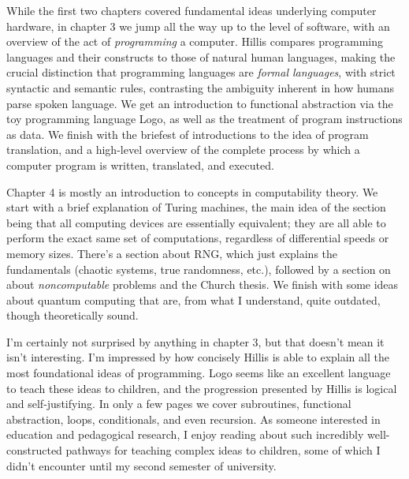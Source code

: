 \documentclass[12pt]{article}
\begin{document}

\pagestyle{fancy}
\fancyhead{} %


While the first two chapters covered fundamental ideas underlying computer
hardware, in chapter 3 we jump all the way up to the level of software, with an
overview of the act of \textit{programming} a computer. Hillis compares
programming languages and their constructs to those of natural human languages,
making the crucial distinction that programming languages are \textit{formal
languages}, with strict syntactic and semantic rules, contrasting the ambiguity
inherent in how humans parse spoken language. We get an introduction to
functional abstraction via the toy programming language Logo, as well as the
treatment of program instructions as data. We finish with the briefest of
introductions to the idea of program translation, and a high-level overview of
the complete process by which a computer program is written, translated, and
executed.

Chapter 4 is mostly an introduction to concepts in computability theory. We
start with a brief explanation of Turing machines, the main idea of the section
being that all computing devices are essentially equivalent; they are all able
to perform the exact same set of computations, regardless of differential
speeds or memory sizes. There's a section about RNG, which just explains the
fundamentals (chaotic systems, true randomness, etc.), followed by a section on
about \textit{noncomputable} problems and the Church thesis. We finish with
some ideas about quantum computing that are, from what I understand, quite
outdated, though theoretically sound.

\vspace{1em}

I'm certainly not surprised by anything in chapter 3, but that doesn't mean it
isn't interesting. I'm impressed by how concisely Hillis is able to explain all
the most foundational ideas of programming. Logo seems like an excellent
language to teach these ideas to children, and the progression presented by
Hillis is logical and self-justifying. In only a few pages we cover
subroutines, functional abstraction, loops, conditionals, and even recursion.
As someone interested in education and pedagogical research, I enjoy reading
about such incredibly well-constructed pathways for teaching complex ideas to
children, some of which I didn't encounter until my second semester of
university.
\end{document}
